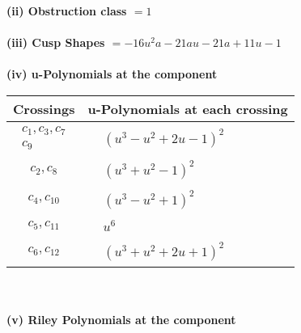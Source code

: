 \documentclass[1p]{elsarticle_modified}
\theoremstyle{definition}
\begin{document}
\flushleft \textbf{(ii) Obstruction class $= 1$}\\~\\
\flushleft \textbf{(iii) Cusp Shapes $= -16 u^2 a-21 a u-21 a+11 u-1$}\\~\\
\newpage\renewcommand{\arraystretch}{1}
\flushleft \textbf{(iv) u-Polynomials at the component}\newline \\
\begin{tabular}{m{50pt}|m{274pt}}
Crossings & \hspace{64pt}u-Polynomials at each crossing \\
\hline $$\begin{aligned}c_{1},c_{3},c_{7}\\c_{9}\end{aligned}$$&$\begin{aligned}
&(u^3- u^2+2 u-1)^2
\end{aligned}$\\
\hline $$\begin{aligned}c_{2},c_{8}\end{aligned}$$&$\begin{aligned}
&(u^3+u^2-1)^2
\end{aligned}$\\
\hline $$\begin{aligned}c_{4},c_{10}\end{aligned}$$&$\begin{aligned}
&(u^3- u^2+1)^2
\end{aligned}$\\
\hline $$\begin{aligned}c_{5},c_{11}\end{aligned}$$&$\begin{aligned}
&u^6
\end{aligned}$\\
\hline $$\begin{aligned}c_{6},c_{12}\end{aligned}$$&$\begin{aligned}
&(u^3+u^2+2 u+1)^2
\end{aligned}$\\
\hline
\end{tabular}\\~\\
\newpage\renewcommand{\arraystretch}{1}
\flushleft \textbf{(v) Riley Polynomials at the component}\newline \\
\end{document}
